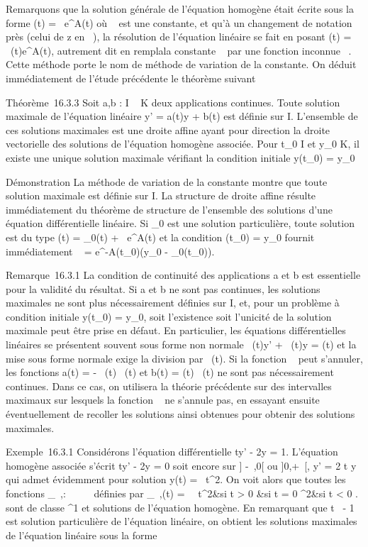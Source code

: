 \documentclass[]{article}
\begin{document}
Remarquons que la solution générale de l'équation homogène était écrite
sous la forme \phi(t) = \lambda~e^A(t) où \lambda~ est une constante, et qu'à
un changement de notation près (celui de z en \lambda~), la résolution de
l'équation linéaire se fait en posant \phi(t) = \lambda~(t)e^A(t),
autrement dit en rempla\ccant la constante \lambda~ par une
fonction inconnue \lambda~. Cette méthode porte le nom de méthode de variation
de la constante. On déduit immédiatement de l'étude précédente le
théorème suivant

Théorème~16.3.3 Soit a,b : I \rightarrow~ K deux applications continues. Toute
solution maximale de l'équation linéaire y' = a(t)y + b(t) est définie
sur I. L'ensemble de ces solutions maximales est une droite affine ayant
pour direction la droite vectorielle des solutions de l'équation
homogène associée. Pour t_0 \in I et y_0 \in K, il existe
une unique solution maximale vérifiant la condition initiale
y(t_0) = y_0

Démonstration La méthode de variation de la constante montre que toute
solution maximale est définie sur I. La structure de droite affine
résulte immédiatement du théorème de structure de l'ensemble des
solutions d'une équation différentielle linéaire. Si \phi_0 est
une solution particulière, toute solution est du type \phi(t) =
\phi_0(t) + \lambda~e^A(t) et la condition \phi(t_0) =
y_0 fournit immédiatement \lambda~ =
e^-A(t_0)(y_0 -
\phi_0(t_0)).

Remarque~16.3.1 La condition de continuité des applications a et b est
essentielle pour la validité du résultat. Si a et b ne sont pas
continues, les solutions maximales ne sont plus nécessairement définies
sur I, et, pour un problème à condition initiale y(t_0) =
y_0, soit l'existence soit l'unicité de la solution maximale
peut être prise en défaut. En particulier, les équations différentielles
linéaires se présentent souvent sous forme non normale \alpha~(t)y' + \beta~(t)y =
\gamma(t) et la mise sous forme normale exige la division par \alpha~(t). Si la
fonction \alpha~ peut s'annuler, les fonctions a(t) = - \beta~(t)
\over \alpha~(t) et b(t) = \gamma(t) \over \alpha~(t)
ne sont pas nécessairement continues. Dans ce cas, on utilisera la
théorie précédente sur des intervalles maximaux sur lesquels la fonction
\alpha~ ne s'annule pas, en essayant ensuite éventuellement de recoller les
solutions ainsi obtenues pour obtenir des solutions maximales.

Exemple~16.3.1 Considérons l'équation différentielle ty' - 2y = 1.
L'équation homogène associée s'écrit ty' - 2y = 0 soit encore sur ]
-\infty~,0[ ou ]0,+\infty~[, y' = 2 \over t y qui admet
évidemment pour solution y(t) = \lambda~t^2. On voit alors que
toutes les fonctions \phi_\lambda~,\mu : ~ \rightarrow~ ~ définies par
\phi_\lambda~,\mu(t) = \left \
\cases \lambda~t^2&si t > 0
 &si t = 0 \cr \mut^2&si t
< 0  \right . sont de classe ^1
et solutions de l'équation homogène. En remarquant que
t\mapsto~ - 1  est
solution particulière de l'équation linéaire, on obtient les solutions
maximales de l'équation linéaire sous la forme
\end{document}
